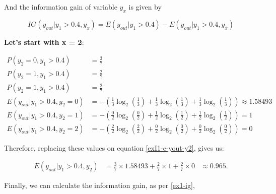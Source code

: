 \documentclass[12pt]{article}
\begin{document}
\begin{enumerate}[leftmargin=\labelsep]
        And the information gain of variable $y_x$ is given by

        \begin{equation}\label{ex1-ig}
          IG(y_{out} |y_1 > 0.4, y_x) = E(y_{out} |y_1 > 0.4) - E(y_{out} |y_1 > 0.4, y_x)
        \end{equation}

        \textbf{Let's start with x = 2}:

        \[
          \begin{aligned}
            P(y_2 = 0, y_1 > 0.4)            & = \frac{3}{7}                                                                                     \\
            P(y_2 = 1, y_1 > 0.4)            & = \frac{2}{7}                                                                                     \\
            P(y_2 = 1, y_1 > 0.4)            & = \frac{2}{7}                                                                                     \\
            E(y_{out} | y_1 > 0.4 , y_2 = 0) & = - \left(\frac{1}{3} \log_2\left(\frac{1}{3}\right) + \frac{1}{3} \log_2\left(\frac{1}{3}\right)
            + \frac{1}{3} \log_2\left(\frac{1}{3}\right)\right) \approx 1.58493                                                                  \\
            E(y_{out} | y_1 > 0.4 , y_2 = 1) & = - \left(\frac{0}{2} \log_2\left(\frac{0}{2}\right) + \frac{1}{2} \log_2\left(\frac{1}{2}\right)
            + \frac{1}{2} \log_2\left(\frac{1}{2}\right)\right) = 1                                                                              \\
            E(y_{out} | y_1 > 0.4 , y_2 = 2) & = - \left(\frac{2}{2} \log_2\left(\frac{2}{2}\right) + \frac{0}{2} \log_2\left(\frac{0}{2}\right)
            + \frac{0}{2} \log_2\left(\frac{0}{2}\right)\right) = 0
          \end{aligned}
        \]

        Therefore, replacing these values on equation \eqref{exI1-e-yout-y2}, gives us:

        \[
          \begin{aligned}
            E(y_{out} | y_1>0.4, y_2) & = \frac{3}{7} \times 1.58493 + \frac{2}{7} \times 1 + \frac{2}{7} \times 0 & \approx 0.965.
          \end{aligned}
        \]

        Finally, we can calculate the information gain, as per \eqref{ex1-ig},


\end{enumerate}
\end{document}
